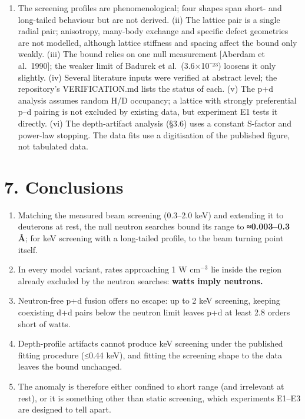 \documentclass[
]{article}
\providecommand{\tightlist}{%
  \setlength{\itemsep}{0pt}\setlength{\parskip}{0pt}}
\begin{document}
\begin{enumerate}
\def\labelenumi{(\roman{enumi})}
\tightlist
\item
  The screening profiles are phenomenological; four shapes span short-
  and long-tailed behaviour but are not derived. (ii) The lattice pair
  is a single radial pair; anisotropy, many-body exchange and specific
  defect geometries are not modelled, although lattice stiffness and
  spacing affect the bound only weakly. (iii) The bound relies on one
  null measurement {[}Aberdam et al.~1990{]}; the weaker limit of
  Badurek et al.~(3.6×10⁻²³) loosens it only slightly. (iv) Several
  literature inputs were verified at abstract level; the repository's
  VERIFICATION.md lists the status of each. (v) The p+d analysis assumes
  random H/D occupancy; a lattice with strongly preferential p--d
  pairing is not excluded by existing data, but experiment E1 tests it
  directly. (vi) The depth-artifact analysis (§3.6) uses a constant
  S-factor and power-law stopping. The data fits use a digitisation of
  the published figure, not tabulated data.
\end{enumerate}

\hypertarget{conclusions}{%
\section{7. Conclusions}\label{conclusions}}

\begin{enumerate}
\def\labelenumi{\arabic{enumi}.}
\tightlist
\item
  Matching the measured beam screening (0.3--2.0 keV) and extending it
  to deuterons at rest, the null neutron searches bound its range to
  \textbf{≈0.003--0.3 Å}; for keV screening with a long-tailed profile,
  to the beam turning point itself.
\item
  In every model variant, rates approaching 1 W cm\(^{-3}\) lie inside
  the region already excluded by the neutron searches: \textbf{watts
  imply neutrons.}
\item
  Neutron-free p+d fusion offers no escape: up to 2 keV screening,
  keeping coexisting d+d pairs below the neutron limit leaves p+d at
  least 2.8 orders short of watts.
\item
  Depth-profile artifacts cannot produce keV screening under the
  published fitting procedure (≤0.44 keV), and fitting the screening
  shape to the data leaves the bound unchanged.
\item
  The anomaly is therefore either confined to short range (and
  irrelevant at rest), or it is something other than static screening,
  which experiments E1--E3 are designed to tell apart.
\end{enumerate}
\end{document}
